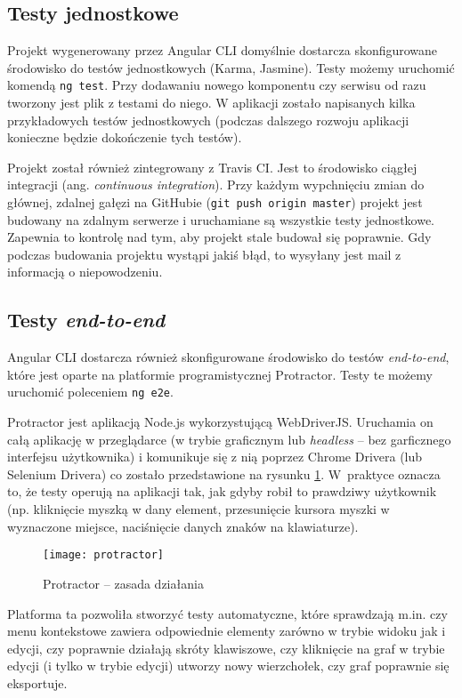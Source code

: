 \subsection*{Testy jednostkowe}

Projekt wygenerowany przez Angular CLI domyślnie dostarcza skonfigurowane środowisko do testów jednostkowych (Karma, Jasmine). Testy możemy uruchomić komendą \texttt{ng test}. Przy dodawaniu nowego komponentu czy serwisu od razu tworzony jest plik z testami do niego. W aplikacji zostało napisanych kilka przykładowych testów jednostkowych (podczas dalszego rozwoju aplikacji konieczne będzie dokończenie tych testów).

Projekt został również zintegrowany z Travis CI. Jest to środowisko ciągłej integracji (ang. \textit{continuous integration}). Przy każdym wypchnięciu zmian do głównej, zdalnej gałęzi na GitHubie (\texttt{git push origin master}) projekt jest budowany na zdalnym serwerze i uruchamiane są wszystkie testy jednostkowe. Zapewnia to kontrolę nad tym, aby projekt stale budował się poprawnie. Gdy podczas budowania projektu wystąpi jakiś błąd, to wysyłany jest mail z informacją o niepowodzeniu.

\subsection*{Testy \textit{end-to-end}}

Angular CLI dostarcza również skonfigurowane środowisko do testów \textit{end-to-end}, które jest oparte na platformie programistycznej Protractor. Testy te możemy uruchomić poleceniem \texttt{ng e2e}. 

Protractor jest aplikacją Node.js wykorzystującą WebDriverJS. Uruchamia on całą aplikację w przeglądarce (w trybie graficznym lub \textit{headless} -- bez garficznego interfejsu użytkownika) i komunikuje się z nią poprzez Chrome Drivera (lub Selenium Drivera) co zostało przedstawione na rysunku \ref{fig:protractor}. W~praktyce oznacza to, że testy operują na aplikacji tak, jak gdyby robił to prawdziwy użytkownik (np. kliknięcie myszką w dany element, przesunięcie kursora myszki w wyznaczone miejsce, naciśnięcie danych znaków na klawiaturze). 

\begin{figure}[H]
\centering
\texttt{[image: protractor]}
\caption{Protractor -- zasada działania}
\label{fig:protractor}
\end{figure}

Platforma ta pozwoliła stworzyć testy automatyczne, które sprawdzają m.in. czy menu kontekstowe zawiera odpowiednie elementy zarówno w trybie widoku jak i edycji, czy poprawnie działają skróty klawiszowe, czy kliknięcie na graf w trybie edycji (i tylko w trybie edycji) utworzy nowy wierzchołek, czy graf poprawnie się eksportuje. 

